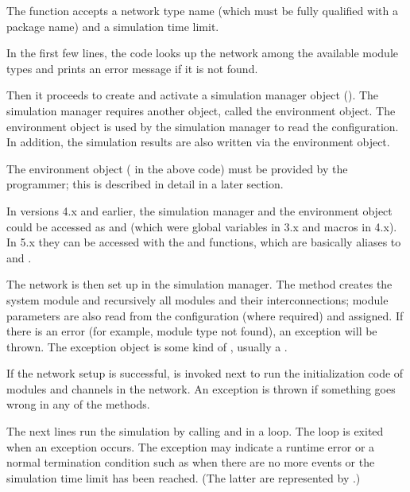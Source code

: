 The function accepts a network type name (which must be fully qualified
with a package name) and a simulation time limit.

In the first few lines, the code looks up the network among the available
module types and prints an error message if it is not found.

Then it proceeds to create and activate a simulation manager object
(). The simulation manager requires another object,
called the environment object. The environment object is used by the
simulation manager to read the configuration. In addition, the simulation
results are also written via the environment object.

The environment object ( in the above code) must
be provided by the programmer; this is described in detail in a later section.

\begin{note}
In versions 4.x and earlier, the simulation manager and the
environment object could be accessed as  and 
(which were global variables in 3.x and macros in 4.x). In 5.x they can be
accessed with the  and  functions,
which are basically aliases to  and
.
\end{note}

The network is then set up in the simulation manager. The
 method creates the system module and
recursively all modules and their interconnections; module parameters are
also read from the configuration (where required) and assigned. If there is
an error (for example, module type not found), an exception will be thrown. The
exception object is some kind of , usually a
.

If the network setup is successful,  is
invoked next to run the initialization code of modules and channels in the
network. An exception is thrown if something goes wrong in any of the
 methods.

The next lines run the simulation by calling
 and 
in a loop. The loop is exited when an exception occurs. The exception
may indicate a runtime error or a normal termination condition such as
when there are no more events or the simulation time limit has been
reached. (The latter are represented by .)


